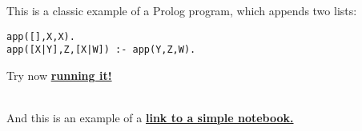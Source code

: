 \documentclass{article}
\begin{document}
\noindent
This is a classic example of a Prolog program, which appends two lists:

\begin{verbatim}
app([],X,X).
app([X|Y],Z,[X|W]) :- app(Y,Z,W).
\end{verbatim}

\noindent
Try now 
\href{https://ciao-lang.org/playground/?code=app(%5B%5D%2CX%2CX).%0Aapp(%5BX%7CY%5D%2CZ%2C%5BX%7CW%5D)%20%3A-%0A%20%20%20%20%20app(Y%2CZ%2CW).%0A}
{\bf running it!}

\ \\
And this is an example of a 
\href{https://ciao-lang.org/playground/?code=%5Ctitle%20A%20member%20look-alike%0A%0A%60%60%60ciao_runnable%0A%3A-%20module(_%2C_).%0A%0Ais_in_list(X%2C%5BX%7C_%5D).%0Ais_in_list(X%2C%5B_%7CT%5D)%20%3A-%0A%20%20%20%20%20%20is_in_list(X%2CT).%0A%60%60%60%0ALoad%20(press%20**%3F**)%20and%20try%20for%20example%3A%0A%0A%60%60%60ciao_runnable%0A%3F-%20is_in_list(X%2C%5B1%2C2%2C3%5D).%0A%60%60%60%0A&ext=.md}
{\bf link to a simple notebook.}
\end{document}
